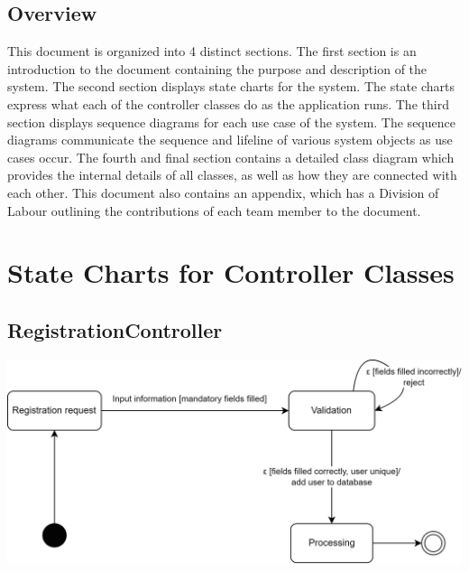 \documentclass[]{article}
\begin{document}
\subsection{Overview}
\label{sub:overview}
This document is organized into 4 distinct sections. The first section is an introduction to the document containing the purpose and description of the system. The second section displays 
state charts for the system. The state charts express what each of the controller classes do as the application runs. The third section displays sequence diagrams for each use case 
of the system. The sequence diagrams communicate the sequence and lifeline of various system objects as use cases occur. The fourth and final section 
contains a detailed class diagram which provides the internal details of all classes, as well as how they are connected with each other. This document also 
contains an appendix, which has a Division of Labour outlining the contributions of each team member to the document.



\section{State Charts for Controller Classes}
\label{sec:state_charts_for_controller_classes}

\subsection*{RegistrationController}
\includegraphics{StateCharts/Registration.png}
\end{document}
